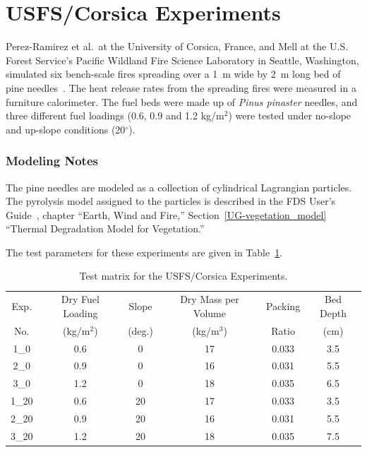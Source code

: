 \section{USFS/Corsica Experiments}
\label{USFS_Corsica_Description}

Perez-Ramirez et al.~at the University of Corsica, France, and Mell at the U.S. Forest Service's Pacific Wildland Fire Science Laboratory in Seattle, Washington, simulated six bench-scale fires spreading over a 1~m wide by 2~m long bed of pine needles~\cite{Perez-Ramirez:FT2017}. The heat release rates from the spreading fires were measured in a furniture calorimeter. The fuel beds were made up of {\em Pinus pinaster} needles, and three different fuel loadings (0.6, 0.9 and 1.2 kg/m$^2$) were tested under no-slope and up-slope conditions (20$^\circ$).

\subsubsection{Modeling Notes}

The pine needles are modeled as a collection of cylindrical Lagrangian particles. The pyrolysis model assigned to the particles is described in the FDS User's Guide~\cite{FDS_Users_Guide}, chapter ``Earth, Wind and Fire,'' Section~\ref{UG-vegetation_model} ``Thermal Degradation Model for Vegetation.''

The test parameters for these experiments are given in Table~\ref{Corsica_Parameters}.

\begin{table}[ht!]
\begin{center}
\begin{tabular}{|c|c|c|c|c|c|}
\hline
Exp.         & Dry Fuel Loading    & Slope 	   & Dry Mass per Volume  & Packing & Bed Depth	    \\
No.          & (kg/m$^2$)          & (deg.)    & (kg/m$^3$)           & Ratio   & (cm)          \\ \hline \hline
1\_0         & 0.6                 & 0         & 17                   & 0.033   & 3.5          	\\ \hline
2\_0         & 0.9                 & 0         & 16                   & 0.031   & 5.5          	\\ \hline
3\_0         & 1.2                 & 0         & 18                   & 0.035   & 6.5          	\\ \hline
1\_20        & 0.6                 & 20        & 17                   & 0.033   & 3.5          	\\ \hline
2\_20        & 0.9                 & 20        & 16                   & 0.031   & 5.5          	\\ \hline
3\_20        & 1.2                 & 20        & 18                   & 0.035   & 7.5          	\\ \hline
\end{tabular}
\end{center}
\caption[Test matrix for the USFS/Corsica Experiments]
{Test matrix for the USFS/Corsica Experiments.}
\label{Corsica_Parameters}
\end{table}



